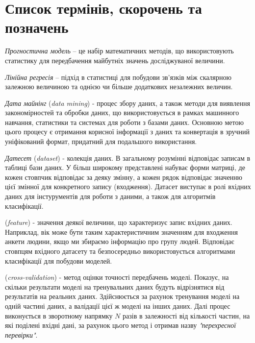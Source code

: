 \section{Список термінів, скорочень та позначень}

\textit{Прогностична модель} – це набір математичних методів, що використовують статистику для передбачення майбутніх значень досліджуваної величини. 

\textit{Лінійна регресія} – підхід в статистиці для побудови зв’язків між скалярною залежною величиною та однією чи більше додаткових незалежних величин.

\textit{Дата майнінг} (\textit{data mining}) - процес збору даних, а також методи для виявлення закономірностей та обробки даних, що використовується в рамках машинного навчання, статистики та системах для роботи з базами даних. Основною метою цього процесу є отримання корисної інформації з даних та конвертація в зручний уніфікований формат, придатний для подальшого використання.

\textit{Датесет} (\textit{dataset}) - колекція даних. В загальному розумінні відповідає записам в таблиці бази даних. У більш широкому представлені набуває форми матриці, де кожен стовпчик відповідає за деяку змінну, а кожен рядок відповідає значенню цієї змінної для конкретного запису (входження). Датасет виступає в ролі вхідних даних для інстурументів для роботи з даними, а також для алгоритмів класифікації. 

 (\textit{feature}) - значення деякої величини, що характеризує запис вхідних даних. Наприклад, вік може бути таким характеристичним значенням для входження анкети людини, якщо ми збираємо інформацію про групу людей. Відповідає стовпцям вхідного датасету та безпосередньо використовується алгоритмами класифікації для побудови моделей.

 (\textit{cross-validation}) - метод оцінки точності передбачень моделі. Показує, на скільки результати моделі на тренувальних даних будуть відрізнятися від результатів на реальних даних. Здійснюється за рахунок тренування моделі на одній частині даних, а валідації цієї ж моделі на інших даних. Далі процес виконується в зворотному напрямку $N$ разів в залежності від кількості частин, на які поділені вхідні дані, за рахунок цього метод і отримав назву \textit{"перехресної перевірки"}.
